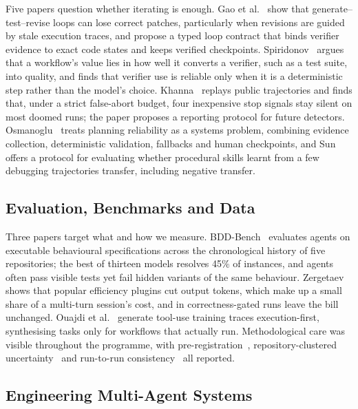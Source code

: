 Five papers question whether iterating is enough. Gao et al.~\cite{agdev26:gao} show that generate--test--revise loops can lose correct patches, particularly when revisions are guided by stale execution traces, and propose a typed loop contract that binds verifier evidence to exact code states and keeps verified checkpoints. Spiridonov~\cite{agdev26:spiridonov} argues that a workflow's value lies in how well it converts a verifier, such as a test suite, into quality, and finds that verifier use is reliable only when it is a deterministic step rather than the model's choice. Khanna~\cite{agdev26:khanna} replays public trajectories and finds that, under a strict false-abort budget, four inexpensive stop signals stay silent on most doomed runs; the paper proposes a reporting protocol for future detectors. Osmanoglu~\cite{agdev26:osmanoglu} treats planning reliability as a systems problem, combining evidence collection, deterministic validation, fallbacks and human checkpoints, and Sun~\cite{agdev26:sun} offers a protocol for evaluating whether procedural skills learnt from a few debugging trajectories transfer, including negative transfer.

\subsection{Evaluation, Benchmarks and Data}

Three papers target what and how we measure. BDD-Bench~\cite{agdev26:jureczka} evaluates agents on executable behavioural specifications across the chronological history of five repositories; the best of thirteen models resolves 45\% of instances, and agents often pass visible tests yet fail hidden variants of the same behaviour. Zergetaev~\cite{agdev26:zergetaev} shows that popular efficiency plugins cut output tokens, which make up a small share of a multi-turn session's cost, and in correctness-gated runs leave the bill unchanged. Ouajdi et al.~\cite{agdev26:ouajdi} generate tool-use training traces execution-first, synthesising tasks only for workflows that actually run. Methodological care was visible throughout the programme, with pre-registration~\cite{agdev26:kerbel,agdev26:khanna}, repository-clustered uncertainty~\cite{agdev26:alawad,agdev26:mahesh} and run-to-run consistency~\cite{agdev26:le,agdev26:stengg} all reported.

\subsection{Engineering Multi-Agent Systems}

